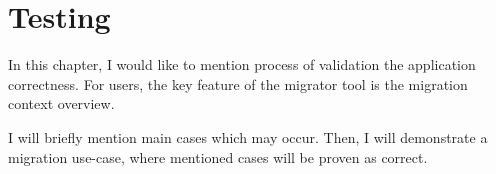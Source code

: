 \chapter{Testing}\label{cptr:testing}

In this chapter, I would like to mention process of validation the application correctness.
For users, the key feature of the migrator tool is the migration context overview.

I will briefly mention main cases which may occur.
Then, I will demonstrate a migration use-case, where mentioned cases will be proven as correct.




